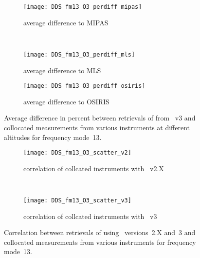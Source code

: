 \begin{figure}[htpb]
    \centering
    \begin{subfigure}[b]{0.49\textwidth}
        \texttt{[image: DDS\_fm13\_O3\_perdiff\_mipas]}
        \caption{average difference to MIPAS}
        \label{fig:fm13:O3:profiles:MIPAS}
    \end{subfigure}
    \,
    \begin{subfigure}[b]{0.49\textwidth}
        \texttt{[image: DDS\_fm13\_O3\_perdiff\_mls]}
        \caption{average difference to MLS}
        \label{fig:fm13:O3:profiles:MLS}
    \end{subfigure}

    \begin{subfigure}[b]{0.49\textwidth}
        \texttt{[image: DDS\_fm13\_O3\_perdiff\_osiris]}
        \caption{average difference to OSIRIS}
        \label{fig:fm13:O3:profiles:OSIRIS}
    \end{subfigure}
    \caption{Average difference in percent between retrievals of 
    from \smr~v3 and collocated measurements from various instruments at
    different altitudes for frequency mode~13.}

    \label{fig:fm13:O3:profiles}
\end{figure}

\begin{figure}[htpb]
    \centering
    \begin{subfigure}[b]{0.49\textwidth}
        \texttt{[image: DDS\_fm13\_O3\_scatter\_v2]}
        \caption{correlation of collcated instruments with \smr~v2.X}
        \label{fig:fm13:O3:scatter:v2}
    \end{subfigure}
    \,
    \begin{subfigure}[b]{0.49\textwidth}
        \texttt{[image: DDS\_fm13\_O3\_scatter\_v3]}
        \caption{correlation of collcated instruments with \smr~v3}
        \label{fig:fm13:O3:scatter:v3}
    \end{subfigure}
    \caption{Correlation between retrievals of  using \smr\
    versions~2.X and~3 and collocated measurements from various instruments
    for frequency mode~13.}
    \label{fig:fm13:O3:scatter}
\end{figure}

